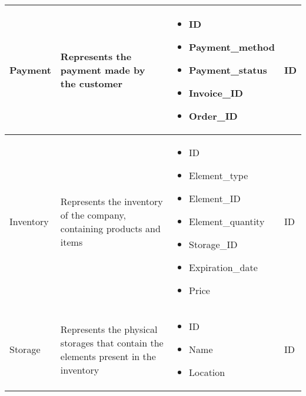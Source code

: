 \begin{longtable}{|p{}|p{} |p{}|p{} |}
    Payment & Represents the payment made by the customer &
    \begin{itemize}
        \vspace{-1em}
        \item ID
        \item Payment\_method
        \item Payment\_status
        \item Invoice\_ID
        \item Order\_ID
    \end{itemize}
    &  ID \\\hline

    Inventory & Represents the inventory of the company, containing products and items &
    \begin{itemize}
        \vspace{-1em}
        \item ID
        \item Element\_type         %
        \item Element\_ID
        \item Element\_quantity
        \item Storage\_ID
        \item Expiration\_date      %
        \item Price                 %
    \end{itemize}
    &  ID \\\hline

    Storage & Represents the physical storages that contain the elements present in the inventory &
        \begin{itemize}
            \vspace{-1em}
            \item ID
            \item Name
            \item Location          %
        \end{itemize}
    &  ID \\\hline


\end{longtable}

